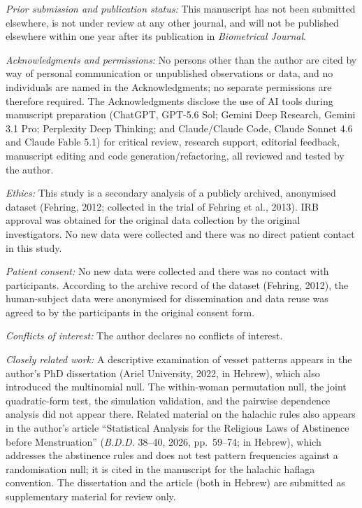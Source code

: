 \documentclass[11pt]{article}
\begin{document}
\textit{Prior submission and publication status:} This manuscript has not been submitted
elsewhere, is not under review at any other journal, and will not be published elsewhere
within one year after its publication in \textit{Biometrical Journal}.

\textit{Acknowledgments and permissions:} No persons other than the author are cited by
way of personal communication or unpublished observations or data, and no individuals
are named in the Acknowledgments; no separate permissions are therefore required. The
Acknowledgments disclose the use of AI tools during manuscript preparation (ChatGPT,
GPT-5.6 Sol; Gemini Deep Research, Gemini 3.1 Pro; Perplexity Deep Thinking; and
Claude/Claude Code, Claude Sonnet 4.6 and Claude Fable 5.1) for critical review, research
support, editorial feedback, manuscript editing and code generation/refactoring, all
reviewed and tested by the author.

\textit{Ethics:} This study is a secondary analysis of a publicly archived, anonymised
dataset (Fehring, 2012; collected in the trial of Fehring et al., 2013). IRB approval
was obtained for the original data collection by the original investigators. No new data
were collected and there was no direct patient contact in this study.

\textit{Patient consent:} No new data were collected and there was no contact with
participants. According to the archive record of the dataset (Fehring, 2012), the
human-subject data were anonymised for dissemination and data reuse was agreed to by the
participants in the original consent form.

\textit{Conflicts of interest:} The author declares no conflicts of interest.

\textit{Closely related work:} A descriptive examination of vesset patterns appears in
the author's PhD dissertation (Ariel University, 2022, in Hebrew), which also introduced
the multinomial null. The within-woman permutation null, the joint quadratic-form test,
the simulation validation, and the pairwise dependence analysis did not appear there.
Related material on the halachic rules also appears in the author's article ``Statistical
Analysis for the Religious Laws of Abstinence before Menstruation'' (\textit{B.D.D.}
38--40, 2026, pp.~59--74; in Hebrew), which addresses the abstinence rules and does not
test pattern frequencies against a randomisation null; it is cited in the manuscript for
the halachic haflaga convention. The dissertation and the article (both in Hebrew) are
submitted as supplementary material for review only.
\end{document}
